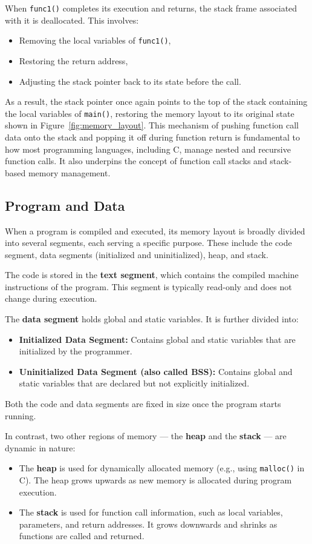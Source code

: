 \documentclass[12pt]{book}
\begin{document}
When \texttt{func1()} completes its execution and returns, the stack frame associated with it is deallocated. This involves:
\begin{itemize}
    \item Removing the local variables of \texttt{func1()},
    \item Restoring the return address,
    \item Adjusting the stack pointer back to its state before the call.
\end{itemize}

As a result, the stack pointer once again points to the top of the stack containing the local variables of \texttt{main()}, restoring the memory layout to its original state shown in Figure~\ref{fig:memory_layout}.
This mechanism of pushing function call data onto the stack and popping it off during function return is fundamental to how most programming languages, including C, manage nested and recursive function calls. It also underpins the concept of function call stacks and stack-based memory management.

\subsection{Program and Data}

When a program is compiled and executed, its memory layout is broadly divided into several segments, each serving a specific purpose. These include the code segment, data segments (initialized and uninitialized), heap, and stack.

The code is stored in the \textbf{text segment}, which contains the compiled machine instructions of the program. This segment is typically read-only and does not change during execution.

The \textbf{data segment} holds global and static variables. It is further divided into:
\begin{itemize}
    \item \textbf{Initialized Data Segment:} Contains global and static variables that are initialized by the programmer.
    \item \textbf{Uninitialized Data Segment (also called BSS):} Contains global and static variables that are declared but not explicitly initialized.
\end{itemize}
Both the code and data segments are fixed in size once the program starts running.

In contrast, two other regions of memory — the \textbf{heap} and the \textbf{stack} — are dynamic in nature:
\begin{itemize}
    \item The \textbf{heap} is used for dynamically allocated memory (e.g., using \texttt{malloc()} in C). The heap grows upwards as new memory is allocated during program execution.
    \item The \textbf{stack} is used for function call information, such as local variables, parameters, and return addresses. It grows downwards and shrinks as functions are called and returned.
\end{itemize}
\end{document}
